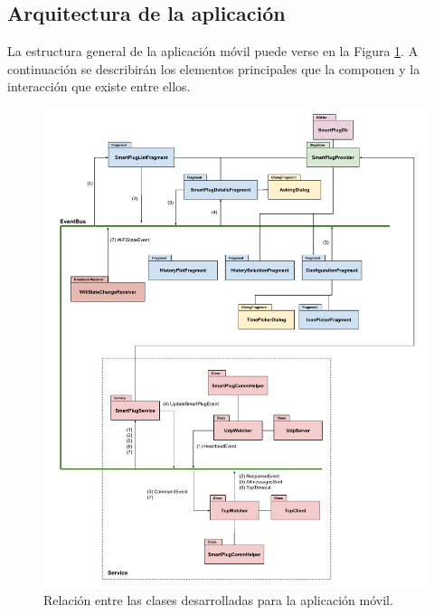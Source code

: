 \subsection{Arquitectura de la aplicación}
\label{subsec:arquitectura_app}

La estructura general de la aplicación móvil puede verse en la Figura \ref{fig:app_arquitectura}. A continuación se describirán los elementos principales que la componen y la interacción que existe entre ellos.

\begin{figure}[h]
	\centering
	\includegraphics[width=14cm]{./Figures/3_3_2_app-arquitectura.pdf}
	\caption{Relación entre las clases desarrolladas para la aplicación móvil.}
	\label{fig:app_arquitectura}
\end{figure}

